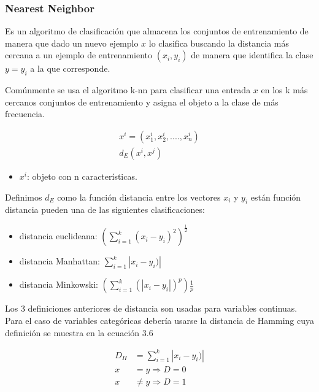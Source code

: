\subsubsection*{Nearest Neighbor}
Es un algoritmo de clasificación que almacena los conjuntos de entrenamiento de manera que dado un nuevo ejemplo $x$ lo clasifica buscando la distancia  más cercana a un ejemplo de entrenamiento $(x_{i},y_{i})$ de manera que identifica la clase $y=y_{i}$ a la que corresponde.

 Comúnmente se usa el algoritmo k-nn para clasificar una entrada $x$ en los k más cercanos conjuntos de entrenamiento y asigna el objeto a la clase de más frecuencia.

  \begin{equation}
  \label{eq:t12}
  \begin{aligned}
  x^i=(x_{1}^i,x_{2}^i,.... ,x_{n}^i)\\
  d_{E}(x^i,x^j)
  \end{aligned}
  \end{equation}
\begin{itemize}
	\item $x^i$: objeto con n características.
	
\end{itemize}

Definimos $d_{E}$ como la función distancia entre los vectores  $x_{i}$ y $y_{i}$ están función distancia pueden una de las siguientes clasificaciones:

  \begin{itemize}

  \item distancia euclideana:    $(\sum_{i=1}^{k}(x_{i} - y_{i})^2)^\frac{1}{2}$
  \item distancia Manhattan:     $\sum_{i=1}^{k}|x_{i} - y_{i})|  $
  \item distancia Minkowski:     $(\sum_{i=1}^{k}(|x_{i} - y_{i}|)^p)\frac{1}{p}$
  \end{itemize}
Los 3 definiciones anteriores de distancia son usadas para variables continuas.  Para el caso de variables categóricas debería usarse la distancia de Hamming cuya definición se muestra en la ecuación 3.6


  \begin{equation}
  \label{eq:t6}
  \begin{aligned}
  	D_{H}&=\sum_{i=1}^{k}|x_{i} - y_{i})|\\
  	x&=y \Longrightarrow D=0\\
  	x&\neq y \Longrightarrow D=1
  \end{aligned}
  \end{equation}
  	
